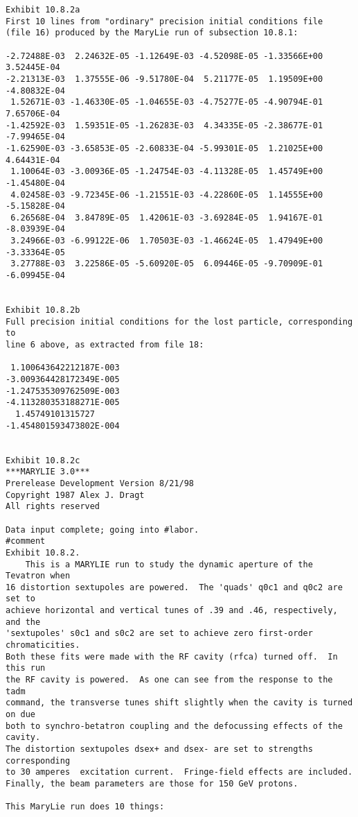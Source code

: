 \begin{footnotesize}
\begin{verbatim}
Exhibit 10.8.2a
First 10 lines from "ordinary" precision initial conditions file
(file 16) produced by the MaryLie run of subsection 10.8.1:

-2.72488E-03  2.24632E-05 -1.12649E-03 -4.52098E-05 -1.33566E+00  3.52445E-04
-2.21313E-03  1.37555E-06 -9.51780E-04  5.21177E-05  1.19509E+00 -4.80832E-04
 1.52671E-03 -1.46330E-05 -1.04655E-03 -4.75277E-05 -4.90794E-01  7.65706E-04
-1.42592E-03  1.59351E-05 -1.26283E-03  4.34335E-05 -2.38677E-01 -7.99465E-04
-1.62590E-03 -3.65853E-05 -2.60833E-04 -5.99301E-05  1.21025E+00  4.64431E-04
 1.10064E-03 -3.00936E-05 -1.24754E-03 -4.11328E-05  1.45749E+00 -1.45480E-04
 4.02458E-03 -9.72345E-06 -1.21551E-03 -4.22860E-05  1.14555E+00 -5.15828E-04
 6.26568E-04  3.84789E-05  1.42061E-03 -3.69284E-05  1.94167E-01 -8.03939E-04
 3.24966E-03 -6.99122E-06  1.70503E-03 -1.46624E-05  1.47949E+00 -3.33364E-05
 3.27788E-03  3.22586E-05 -5.60920E-05  6.09446E-05 -9.70909E-01 -6.09945E-04


Exhibit 10.8.2b
Full precision initial conditions for the lost particle, corresponding to
line 6 above, as extracted from file 18:

 1.100643642212187E-003
-3.009364428172349E-005
-1.247535309762509E-003
-4.113280353188271E-005
  1.45749101315727
-1.454801593473802E-004


Exhibit 10.8.2c
***MARYLIE 3.0***
Prerelease Development Version 8/21/98
Copyright 1987 Alex J. Dragt
All rights reserved

Data input complete; going into #labor.
#comment
Exhibit 10.8.2.
    This is a MARYLIE run to study the dynamic aperture of the Tevatron when
16 distortion sextupoles are powered.  The 'quads' q0c1 and q0c2 are set to
achieve horizontal and vertical tunes of .39 and .46, respectively, and the
'sextupoles' s0c1 and s0c2 are set to achieve zero first-order chromaticities.
Both these fits were made with the RF cavity (rfca) turned off.  In this run
the RF cavity is powered.  As one can see from the response to the tadm
command, the transverse tunes shift slightly when the cavity is turned on due
both to synchro-betatron coupling and the defocussing effects of the cavity.
The distortion sextupoles dsex+ and dsex- are set to strengths corresponding
to 30 amperes  excitation current.  Fringe-field effects are included.
Finally, the beam parameters are those for 150 GeV protons.

This MaryLie run does 10 things:


\end{verbatim}
\end{footnotesize}
